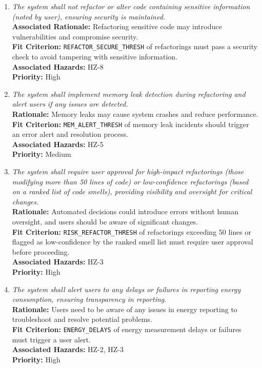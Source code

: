 \documentclass{article}
\begin{document}
\begin{enumerate}[label=SCR \arabic*., wide=0pt, leftmargin=*]
    \item \emph{The system shall not refactor or alter code containing sensitive information (noted by user), ensuring security is maintained.}\\
    {\bf Associated Rationale:} Refactoring sensitive code may introduce vulnerabilities and compromise security.\\
    {\bf Fit Criterion:} \texttt{REFACTOR\_SECURE\_THRESH} of refactorings must pass a security check to avoid tampering with sensitive information.\\
    {\bf Associated Hazards:} HZ-8\\
    {\bf Priority:} High

    \item \emph{The system shall implement memory leak detection during refactoring and alert users if any issues are detected.}\\
    {\bf Rationale:} Memory leaks may cause system crashes and reduce performance.\\
    {\bf Fit Criterion:} \texttt{MEM\_ALERT\_THRESH} of memory leak incidents should trigger an error alert and resolution process.\\
    {\bf Associated Hazards:} HZ-5\\
    {\bf Priority:} Medium

    \item \emph{The system shall require user approval for high-impact refactorings (those modifying more than 50 lines of code) or low-confidence refactorings (based on a ranked list of code smells), providing visibility and oversight for critical changes.}\\
    {\bf Rationale:} Automated decisions could introduce errors without human oversight, and users should be aware of significant changes.\\
    {\bf Fit Criterion:} \texttt{RISK\_REFACTOR\_THRESH} of refactorings exceeding 50 lines or flagged as low-confidence by the ranked smell list must require user approval before proceeding.\\
    {\bf Associated Hazards:} HZ-3\\
    {\bf Priority:} High

    \item \emph{The system shall alert users to any delays or failures in reporting energy consumption, ensuring transparency in reporting.}\\
    {\bf Rationale:} Users need to be aware of any issues in energy reporting to troubleshoot and resolve potential problems.\\
    {\bf Fit Criterion:} \texttt{ENERGY\_DELAYS} of energy measurement delays or failures must trigger a user alert.\\
    {\bf Associated Hazards:} HZ-2, HZ-3\\
    {\bf Priority:} High


\end{enumerate}
\end{document}
